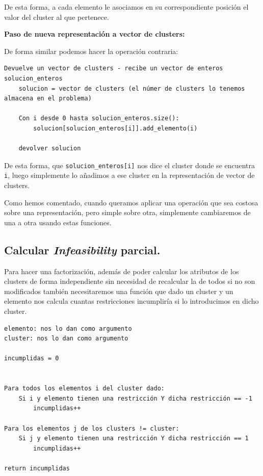 \documentclass[12pt, spanish]{article}
\begin{document}
De esta forma, a cada elemento le asociamos en su correspondiente posición el valor del cluster al que pertenece.

\textbf{Paso de nueva representación a vector de clusters:}

De forma similar podemos hacer la operación contraria:

\begin{lstlisting}
Devuelve un vector de clusters - recibe un vector de enteros solucion_enteros
	solucion = vector de clusters (el númer de clusters lo tenemos almacena en el problema)

	Con i desde 0 hasta solucion_enteros.size():
		solucion[solucion_enteros[i]].add_elemento(i)

	devolver solucion
\end{lstlisting}

De esta forma, que \texttt{solucion\_enteros[i]} nos dice el cluster donde se encuentra \texttt{i}, luego simplemente lo añadimos a ese cluster en la representación de vector de clusters.



Como hemos comentado, cuando queramos aplicar una operación que sea costosa sobre una representación, pero simple sobre otra, simplemente cambiaremos de una a otra usando estas funciones.

\newpage


\subsection{Calcular \textit{Infeasibility} parcial.}

Para hacer una factorización, además de poder calcular los atributos de los clusters de forma independiente sin necesidad de recalcular la de todos si no son modificados también necesitaremos una función que dado un cluster y un elemento nos calcula cuantas restricciones incumpliría si lo introducimos en dicho cluster.


\begin{lstlisting}
elemento: nos lo dan como argumento
cluster: nos lo dan como argumento

incumplidas = 0


Para todos los elementos i del cluster dado:
	Si i y elemento tienen una restricción Y dicha restricción == -1
		incumplidas++

Para los elementos j de los clusters != cluster:
	Si j y elemento tienen una restricción Y dicha restricción == 1
		incumplidas++

return incumplidas


\end{lstlisting}
\end{document}
